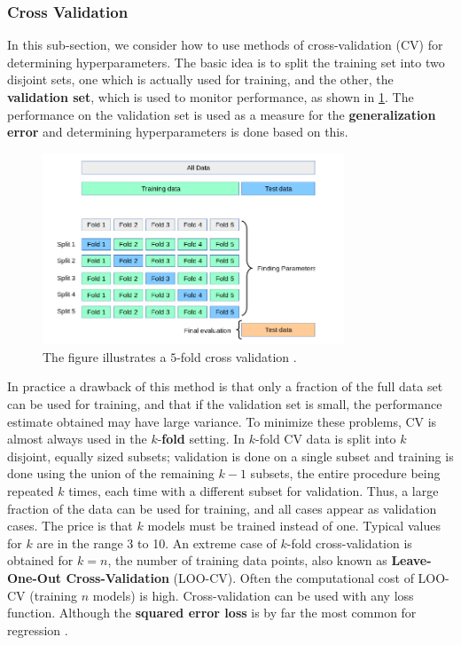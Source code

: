 \documentclass[10pt]{article}
\theoremstyle{definition}
\theoremstyle{definition}
\theoremstyle{remark}
\begin{document}
\subsubsection{Cross Validation}
In this sub-section, we consider how to use methods of cross-validation (CV) for determining hyperparameters. The basic idea is to split the training set into two disjoint sets, one which is actually used for training, and the other, the \textbf{validation set}, which is used to monitor performance, as shown in \cref{fig:cross:validation}. The performance on the validation set is used as a measure for the \textbf{generalization error} and determining hyperparameters is done based on this.
\begin{figure}[b!]
\centering
\includegraphics[width=9cm]{figs/cross-validation.png}
\caption{The figure illustrates a $5$-fold cross validation \cite{sklearn}.}
\label{fig:cross:validation}
\end{figure}
In practice a drawback of this method is that only a fraction of the full data set can be used for training, and that if the validation set is small, the performance estimate obtained may have large variance. To minimize these problems, CV is almost always used in the $k$-\textbf{fold} setting. In $k$-fold CV data is split into $k$ disjoint, equally sized subsets; validation is done on a single subset and training is done using the union of the remaining $k -1$ subsets, the entire procedure being repeated $k$ times, each time with a different subset for validation. Thus, a large fraction of the data can be used for training, and all cases appear as validation cases. The price is that $k$ models must be trained instead of one. Typical values for $k$ are in the range 3 to 10. An extreme case of $k$-fold cross-validation is obtained for $k = n$, the number of training data points, also known as \textbf{Leave-One-Out Cross-Validation} (LOO-CV). Often the computational cost of LOO-CV (training $n$ models) is high. Cross-validation can be used with any loss function. Although the \textbf{squared error loss} is by far the most common for regression \cite[Chapter 5]{Rasmussen2006}. 
\end{document}
